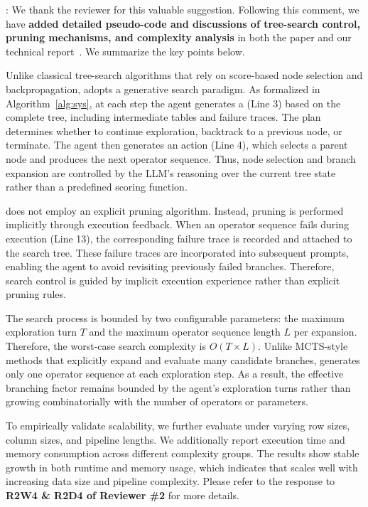 :
We thank the reviewer for this valuable suggestion. Following this comment, we have \textbf{added detailed pseudo-code and discussions of tree-search control, pruning mechanisms, and complexity analysis} in both the paper and our technical report~\cite{technical_report}. We summarize the key points below.

Unlike classical tree-search algorithms that rely on score-based node selection and backpropagation, \sys adopts a generative search paradigm. As formalized in Algorithm~\ref{alg:sys}, at each step the agent generates a  (Line 3) based on the complete tree, including intermediate tables and failure traces. The plan determines whether to continue exploration, backtrack to a previous node, or terminate. The agent then generates an  action (Line 4), which selects a parent node and produces the next operator sequence. Thus, node selection and branch expansion are controlled by the LLM's reasoning over the current tree state rather than a predefined scoring function.

\sys does not employ an explicit pruning algorithm. Instead, pruning is performed implicitly through execution feedback. When an operator sequence fails during execution (Line 13), the corresponding failure trace is recorded and attached to the search tree. These failure traces are incorporated into subsequent prompts, enabling the agent to avoid revisiting previously failed branches. Therefore, search control is guided by implicit execution experience rather than explicit pruning rules.

The search process is bounded by two configurable parameters: the maximum exploration turn $T$ and the maximum operator sequence length $L$ per expansion. Therefore, the worst-case search complexity is $O(T \times L)$. Unlike MCTS-style methods that explicitly expand and evaluate many candidate branches, \sys generates only one operator sequence at each exploration step. As a result, the effective branching factor remains bounded by the agent's exploration turns rather than growing combinatorially with the number of operators or parameters.

To empirically validate scalability, we further evaluate \sys under varying row sizes, column sizes, and pipeline lengths. We additionally report execution time and memory consumption across different complexity groups. The results show stable growth in both runtime and memory usage, which indicates that \sys scales well with increasing data size and pipeline complexity. Please refer to the response to \textbf{R2W4 \& R2D4 of Reviewer \#2} for more details. 


